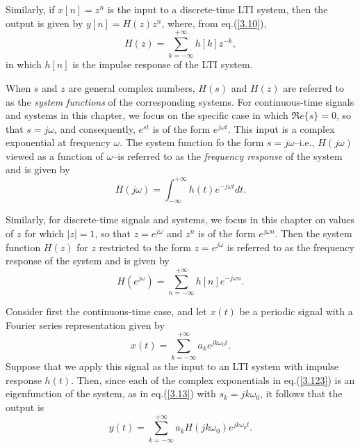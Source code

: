 \documentclass[a4paper,twoside]{book}
\begin{document}
Similarly, if $x[n]=z^n$ is the input to a discrete-time LTI system, then the output is given by $y[n]=H(z)z^n$, where, from eq.\;(\ref{3.10}),
\begin{equation}
    H(z)=\sum_{k=-\infty}^{+\infty}h[k]z^{-k},
    \label{3.120}
\end{equation}
in which $h[n]$ is the impulse response of the LTI system.

When $s$ and $z$ are general complex numbers, $H(s)$ and $H(z)$ are referred to as the \textit{system functions} of the corresponding systems. For continuous-time signals and systems in this chapter, we focus on the specific case in which $\Re e\{s\}=0$, so that $s=j\omega$, and consequently, $e^{st}$ is of the form $e^{j\omega t}$. This input is a complex exponential at frequency $\omega$. The system function fo the form $s=j\omega$--i.e., $H(j\omega)$ viewed as a function of $\omega$--is referred to as the \textit{frequency response} of the system and is given by
\begin{equation}
    H(j\omega)=\int_{-\infty}^{+\infty}h(t)e^{-j\omega t}dt.
    \label{3.121}
\end{equation}

Similarly, for discrete-time signals and systems, we focus in this chapter on values of $z$ for which $|z|=1$, so that $z=e^{j\omega}$ and $z^n$ is of the form $e^{j\omega n}$. Then the system function $H(z)$ for $z$ restricted to the form $z=e^{j\omega}$ is referred to as the frequency response of the system and is given by
\begin{equation}
    H(e^{j\omega})=\sum_{n=-\infty}^{+\infty}h[n]e^{-j\omega n}.
    \label{3.122}
\end{equation}

Consider first the continuous-time case, and let $x(t)$ be a periodic signal with a Fourier series representation given by
\begin{equation}
    x(t) = \sum_{k=-\infty}^{+\infty}a_ke^{jk\omega_0t}.
    \label{3.123}
\end{equation}
Suppose that we apply this signal as the input to an LTI system with impulse response $h(t)$. Then, since each of the complex exponentials in eq.\;(\ref{3.123}) is an eigenfunction of the system, as in eq.\;(\ref{3.13}) with $s_k=jk\omega_0$, it follows that the output is
\begin{equation}
    y(t)=\sum_{k=-\infty}^{+\infty}a_kH(jk\omega_0)e^{jk\omega_0t}.
    \label{3.124}
\end{equation}
\end{document}
